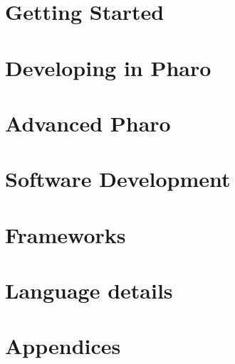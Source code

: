 \documentclass[a4paper,10pt,twoside]{book}
\begin{document}
\part{Getting Started}




\part{Developing in Pharo}







\part{Advanced Pharo}


\part{Software Development}

%
%
%

\part{Frameworks}

%



\part{Language details}

%
%


\appendix
\part{Appendices}



{\small\raggedright\printindex}
\cleardoublepage
~ %
\cleardoublepage
~ %
\cleardoublepage
\end{document}
